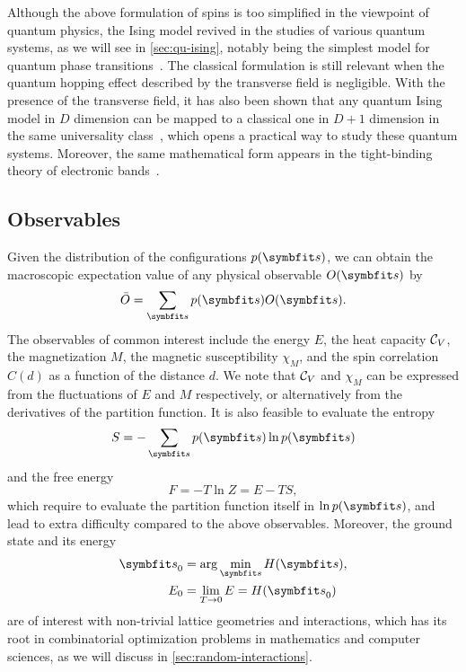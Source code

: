 Although the above formulation of spins is too simplified in the viewpoint of quantum physics, the Ising model revived in the studies of various quantum systems, as we will see in \cref{sec:qu-ising}, notably being the simplest model for quantum phase transitions~\cite{sachdev2001quantum}. The classical formulation is still relevant when the quantum hopping effect described by the transverse field is negligible. With the presence of the transverse field, it has also been shown that any quantum Ising model in $D$ dimension can be mapped to a classical one in $D + 1$ dimension in the same universality class~\cite{hertz1976quantum}, which opens a practical way to study these quantum systems. Moreover, the same mathematical form appears in the tight-binding theory of electronic bands~\cite{treglia1988segregation}.

\subsection{Observables}

Given the distribution of the configurations $p(\vs)$, we can obtain the macroscopic expectation value of any physical observable $O(\vs)$ by
\begin{equation}
\bar{O} = \sum_\vs p(\vs) O(\vs).
\label{eq:cl-obs}
\end{equation}
The observables of common interest include the energy $E$, the heat capacity $\mathcal{C}_V$, the magnetization $M$, the magnetic susceptibility $\chi_M$, and the spin correlation $C(d)$ as a function of the distance $d$. We note that $\mathcal{C}_V$ and $\chi_M$ can be expressed from the fluctuations of $E$ and $M$ respectively, or alternatively from the derivatives of the partition function. It is also feasible to evaluate the entropy
\begin{equation}
S = -\sum_\vs p(\vs) \ln p(\vs)
\end{equation}
and the free energy
\begin{equation}
F = -T \ln Z = E - T S,
\end{equation}
which require to evaluate the partition function itself in $\ln p(\vs)$, and lead to extra difficulty compared to the above observables. Moreover, the ground state and its energy
\begin{align}
\vs_0 &= \arg\min_\vs H(\vs), \\
E_0 &= \lim_{T \to 0} E = H(\vs_0)
\end{align}
are of interest with non-trivial lattice geometries and interactions, which has its root in combinatorial optimization problems in mathematics and computer sciences, as we will discuss in \cref{sec:random-interactions}.

